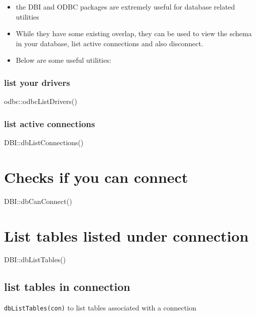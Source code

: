 \documentclass[
  letterpaper,
  DIV=11,
  numbers=noendperiod]{scrreprt}
\providecommand{\tightlist}{%
  \setlength{\itemsep}{0pt}\setlength{\parskip}{0pt}}\usepackage{longtable,booktabs,array}
\begin{document}
\begin{tcolorbox}[enhanced jigsaw, title=\textcolor{quarto-callout-note-color}{\faInfo}\hspace{0.5em}{Additional Utilities}, bottomrule=.15mm, titlerule=0mm, left=2mm, rightrule=.15mm, opacityback=0, colframe=quarto-callout-note-color-frame, bottomtitle=1mm, coltitle=black, colback=white, leftrule=.75mm, breakable, colbacktitle=quarto-callout-note-color!10!white, opacitybacktitle=0.6, toprule=.15mm, toptitle=1mm, arc=.35mm]

\begin{itemize}
\tightlist
\item
  the DBI and ODBC packages are extremely useful for database related
  utilities
\item
  While they have some existing overlap, they can be used to view the
  schema in your database, list active connections and also disconnect.
\item
  Below are some useful utilities:
\end{itemize}

\subsubsection{list your drivers}\label{list-your-drivers}

odbc::odbcListDrivers()

\subsubsection{list active connections}\label{list-active-connections}

DBI::dbListConnections()

\section{Checks if you can connect}\label{checks-if-you-can-connect}

DBI::dbCanConnect()

\section{List tables listed under
connection}\label{list-tables-listed-under-connection}

DBI::dbListTables()

\subsection{list tables in connection}\label{list-tables-in-connection}

\texttt{dbListTables(con)} to list tables associated with a connection

\end{tcolorbox}
\end{document}
